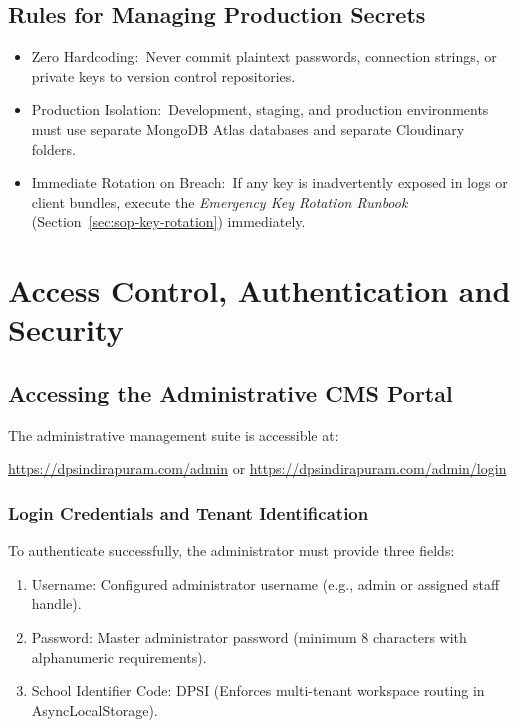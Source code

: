 \documentclass[11pt,a4paper,oneside]{report}
\def\textbf#1{#1}
\def\texttt#1{#1}
\def\&{and}
\begin{document}
\section{Rules for Managing Production Secrets}

\begin{itemize}[leftmargin=*]
  \item \textbf{Zero Hardcoding:}\ Never commit plaintext passwords, connection strings,
        or private keys to version control repositories.
  \item \textbf{Production Isolation:}\ Development, staging, and production environments
        must use separate MongoDB Atlas databases and separate Cloudinary folders.
  \item \textbf{Immediate Rotation on Breach:}\ If any key is inadvertently exposed in logs
        or client bundles, execute the \textit{Emergency Key Rotation Runbook} (Section~\ref{sec:sop-key-rotation}) immediately.
\end{itemize}

\chapter{Access Control, Authentication \texorpdfstring{\&}{and} Security}

\section{Accessing the Administrative CMS Portal}

The administrative management suite is accessible at:
\begin{center}
  \url{https://dpsindirapuram.com/admin} \quad \textnormal{or} \quad \url{https://dpsindirapuram.com/admin/login}
\end{center}

\subsection{Login Credentials and Tenant Identification}

To authenticate successfully, the administrator must provide three fields:
\begin{enumerate}
  \item \textbf{Username:} Configured administrator username (e.g., \texttt{admin} or assigned staff handle).
  \item \textbf{Password:} Master administrator password (minimum 8 characters with alphanumeric requirements).
  \item \textbf{School Identifier Code:} \texttt{DPSI} (Enforces multi-tenant workspace routing in \texttt{AsyncLocalStorage}).
\end{enumerate}
\end{document}
